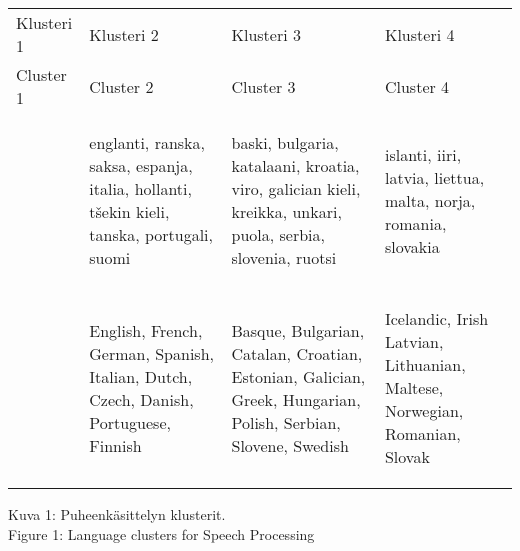 \documentclass[]{../../metanetpaper}
\begin{document}
\begin{Parallel}[c]{77mm}{77mm}
\ParallelPar

\begin{center}
\begin{tabular}{|p{2cm}|p{4cm}|p{4cm}|p{4cm}|}

Klusteri 1 & Klusteri 2 & Klusteri 3 & Klusteri 4 \\
Cluster 1  & Cluster 2  & Cluster 3  & Cluster 4 \\ \hline
&
   \begin{center}
    englanti, ranska, saksa, espanja, italia, hollanti, tšekin kieli,
                         tanska, portugali, suomi
   \end{center}
&
    \begin{center}
         baski, bulgaria, katalaani, kroatia, viro, galician kieli,
                               kreikka, unkari,
                                puola, serbia,
                              slovenia, ruotsi
    \end{center}
&
    \begin{center}
                                islanti, iiri,
                         latvia, liettua, malta, norja,
                              romania, slovakia 
    \end{center}
\\

&
    \begin{center}
           English, French, German, Spanish, Italian, Dutch, Czech,
                          Danish, Portuguese, Finnish
    \end{center}
&
    \begin{center}
           Basque, Bulgarian, Catalan, Croatian, Estonian, Galician,
                               Greek, Hungarian,
                                Polish, Serbian,
                               Slovene, Swedish
   \end{center}
&
   \begin{center}
                               Icelandic, Irish
                    Latvian, Lithuanian, Maltese, Norwegian,
                               Romanian, Slovak 
   \end{center}
\end{tabular}

Kuva 1: Puheenkäsittelyn klusterit. \\
Figure 1: Language clusters for Speech Processing
\end{center}

\begin{center}
\begin{tabular}{|p{2cm}|p{2cm}|p{3cm}|p{6cm}|}


\end{tabular}
\end{center}
\end{Parallel}
\end{document}
